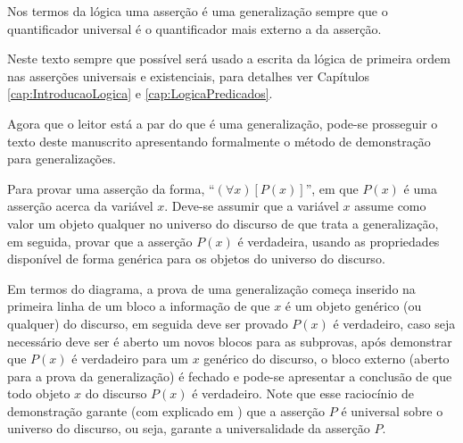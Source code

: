Nos termos da lógica uma asserção é uma generalização sempre que o quantificador universal é o quantificador mais externo a da asserção.

\begin{remark}
	Neste texto sempre que possível será usado a escrita da lógica de primeira ordem nas asserções universais e existenciais, para detalhes ver Capítulos \ref{cap:IntroducaoLogica} e \ref{cap:LogicaPredicados}. 
\end{remark}

Agora que o leitor está a par do que é uma generalização, pode-se prosseguir o texto deste manuscrito apresentando formalmente o método de demonstração para generalizações.

\begin{definition}
	Para provar uma asserção da forma, ``$(\forall x)[P(x)]$'', em que $P(x)$ é uma asserção acerca da variável $x$. Deve-se assumir que a variável $x$ assume como valor um objeto qualquer no universo do discurso de que trata a  generalização, em seguida, provar que a asserção $P(x)$ é verdadeira, usando as propriedades disponível de forma genérica para os objetos do universo do discurso.
\end{definition}

Em termos do diagrama, a prova de uma generalização começa inserido na primeira linha de um bloco a informação de que $x$ é um objeto genérico (ou qualquer) do discurso, em seguida deve ser provado $P(x)$ é verdadeiro, caso seja necessário deve ser é aberto um novos blocos para as subprovas, após demonstrar que $P(x)$ é verdadeiro para um $x$ genérico do discurso, o bloco externo (aberto para a prova da generalização) é fechado e  pode-se apresentar a conclusão de que todo objeto $x$ do discurso $P(x)$ é verdadeiro. Note que esse raciocínio de demonstração garante (com explicado em \cite{velleman2019comProvar}) que a asserção $P$ é universal sobre o universo do discurso, ou seja, garante a universalidade da asserção $P$.

